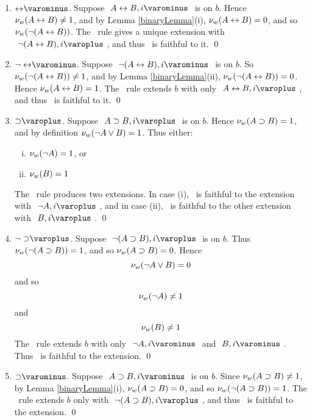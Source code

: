 \begin{proof*}
\begin{enumerate}
		\item $\uRule{ \biarrow }$. 	Suppose $ \like{ \uNode{ A \biarrow B }{ i } } $ is on $ b $.
								Hence $ \mathcal{\nu}_{ w }({ A \leftrightarrow B }) \neq 1 $, and by Lemma \ref{binaryLemma}(i),
								$ \mathcal{\nu}_{ w }({ A \leftrightarrow B }) = 0 $, and so $ \mathcal{\nu}_{ w }({ \neg (A \leftrightarrow B) }) $.
								The \uRule{\biarrow}\ rule gives a unique extension with $ \like{\dNodei{ \neg (A \biarrow B) } } $, 
								and thus \Model\ is faithful to it.
								\qed

		\item $\uRule{ \neg\biarrow }$. Suppose $ \like{ \uNode{ \neg (A \biarrow B) }{ i } } $ is on $ b $.
								So $ \mathcal{\nu}_{ w }({ \neg (A \leftrightarrow B) }) \neq 1 $, and by Lemma \ref{binaryLemma}(ii), $ \mathcal{\nu}_{ w }({ \neg (A \leftrightarrow B) }) = 0 $.
								Hence $ \mathcal{\nu}_{ w }({ A \leftrightarrow B }) = 1 $. The \uRule{ \neg\biarrow }\ rule extends $b$ with only $ \like{\dNodei{ A \biarrow B }} $,
								and thus \Model\ is faithful to it.
								\qed

		\item $\dRule{ \supset }$. 	Suppose $ \like{ \dNode{ A \supset B }{ i } } $ is on $ b $.
							Hence $ \mathcal{\nu}_{ w }({ A \supset B }) = 1 $, and by definition $ \mathcal{\nu}_{ w }({ \neg A \vee B }) = 1 $.
							Thus either:
							\begin{enumerate}[(i)]
								\item $ \mathcal{\nu}_{ w }({ \neg A }) = 1 $, or
								\item $ \mathcal{\nu}_{ w }({ B }) = 1 $
							\end{enumerate}
							The \dRule{ \supset }\ rule produces two extensions. In case (i), \Model\ is faithful to the extension with $ \like{ \dNodei{ \neg A }} $, 
							and in case (ii), \Model\ is faithful to the other extension with $ \like{ \dNodei{ B }} $.
							\qed

		\item $\dRule{ \neg\supset }$. Suppose $ \like{ \dNode{ \neg (A \supset B) }{ i } } $ is on $ b $.
								Thus $ \mathcal{\nu}_{ w }({ \neg (A \supset B )}) = 1 $, and so $ \mathcal{\nu}_{ w }({ A \supset B }) = 0 $.
								Hence
								\[ \mathcal{\nu}_{ w }({ \neg A \vee B }) = 0 \]
								and so
								\[ \mathcal{\nu}_{ w }({ \neg A }) \neq 1 \]
								and
								\[ \mathcal{\nu}_{ w }({ B }) \neq 1 \]
								The \dRule{ \neg\supset }\ rule extends $b$ with only $ \like{\uNodei{ \neg A }} $ and $ \like{ \uNodei{ B }} $.
								Thus \Model\ is faithful to the extension.
								\qed
								

		\item $\uRule{ \supset }$. 	Suppose $ \like{ \uNode{ A \supset B }{ i } } $ is on $ b $.
								Since $ \mathcal{\nu}_{ w }({ A \supset B }) \neq 1 $, by Lemma \ref{binaryLemma}(i), $ \mathcal{\nu}_{ w }({ A \supset B }) = 0 $,
								and so $ \mathcal{\nu}_{ w }({ \neg (A \supset B ) }) = 1 $.
								The \uRule{ \supset }\ rule extends $b$ only with $ \like{ \dNodei{ \neg (A \supset B )}} $, 
								and thus \Model\ is faithful to the extension. 
								\qed


\end{enumerate}
\end{proof*}
